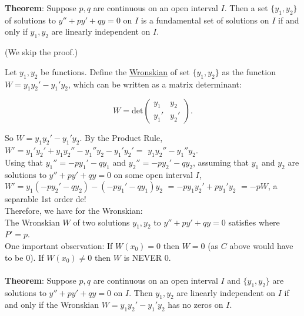 \documentclass{ximera}
\begin{document}
\newpage

 \textbf{Theorem}:   Suppose $p,q$ are continuous on an open interval $I$.  Then a set $\{y_{1},y_{2}\}$ of solutions to $y''+py'+qy=0$ on $I$ is a fundamental set of solutions on $I$ if and only if $y_{1},y_{2}$ are linearly independent on $I$.

 (We skip the proof.)


  Let $y_1,y_2$ be functions.   Define the \underline{Wronskian} of set $\{y_{1},y_{2}\}$  as the function $W=y_{1}y_{2}'-y_{1}'y_{2}$,  which can be written as a matrix determinant:
 
 \[W=\mathrm{det}\left( \begin{array}{cc}
 y_{1} & y_{2}\\
 y_{1}' & y_{2}' \end{array}\right).\]

\vspace{0.5cm}

 So $W=y_{1}y_{2}'-y_{1}'y_{2}$.   By the Product Rule, $W'=y_{1}'y_{2}'+y_{1}y_{2}''-y_{1}''y_{2}-y_{1}'y_{2}'=$ 
 $y_{1}y_{2}''-y_{1}''y_{2}$.\\

 Using that $y_{1}''=-p y_{1}'-qy_{1}$ and  $y_{2}''=-p y_{2}'-qy_{2}$, assuming that $y_1$ and $y_2$ are solutions to $y''+py'+qy=0$ on some open interval $I$, \\

 $W'=y_{1}(-py_{2}'-qy_{2})-(-py_{1}'-qy_{1})y_{2}$  $=-py_{1}y_{2}'+py_{1}'y_{2}$  $=-p W$,  a separable 1st order de!\\

 Therefore, we have  for the Wronskian: \\

 The Wronskian $W$ of two solutions $y_1,y_2$ to $y''+py'+qy=0$ satisfies  where $P'=p$.\\

 One important observation:  If $W(x_{0})=0$ then $W=0$ (as $C$ above would have to be $0$).  If $W(x_{0})\neq 0$ then $W$ is NEVER $0$.\\ \\


  \textbf{Theorem}:   Suppose $p,q$ are continuous on an open interval $I$ and $\{y_{1},y_{2}\}$ are solutions to $y''+py'+qy=0$ on $I$.  Then $y_{1},y_{2}$ are linearly independent on $I$ if and only if the Wronskian  $W=y_{1}y_{2}'-y_{1}'y_{2}$ has no zeros on $I$.\\
\end{document}
